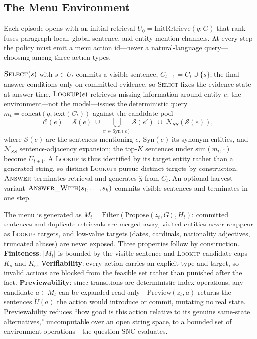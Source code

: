 \documentclass[letterpaper]{article} %
\begin{document}
\subsection{The Menu Environment}

Each episode opens with an initial retrieval $U_0=\mathrm{InitRetrieve}(q;G)$ that rank-fuses paragraph-local, global-sentence, and entity-mention channels. At every step the policy must emit a menu action id---never a natural-language query---choosing among three action types.

$\textsc{Select}(s)$ with $s\in U_t$ commits a visible sentence, $C_{t+1}=C_t\cup\{s\}$; the final answer conditions only on committed evidence, so \textsc{Select} fixes the evidence state at answer time. $\textsc{Lookup}(e)$ retrieves missing information around entity $e$: the environment---not the model---issues the deterministic query $m_t=\mathrm{concat}(q,\mathrm{text}(C_t))$ against the candidate pool
\begin{equation}
\mathcal{C}(e)=\mathcal{S}(e)\;\cup \bigcup_{e'\in \mathrm{Syn}(e)}\mathcal{S}(e')\;\cup\;\mathcal{N}_{SS}(\mathcal{S}(e)),
\end{equation}
where $\mathcal{S}(e)$ are the sentences mentioning $e$, $\mathrm{Syn}(e)$ its synonym entities, and $\mathcal{N}_{SS}$ sentence-adjacency expansion; the top-$K$ sentences under $\mathrm{sim}(m_t,\cdot)$ become $U_{t+1}$. A \textsc{Lookup} is thus identified by its target entity rather than a generated string, so distinct \textsc{Lookup}s pursue distinct targets by construction. $\textsc{Answer}$ terminates retrieval and generates $\hat y$ from $C_t$. An optional harvest variant $\textsc{Answer\_With}(s_1,\ldots,s_k)$ commits visible sentences and terminates in one step.

The menu is generated as $M_t=\mathrm{Filter}(\mathrm{Propose}(z_t,G),H_t)$: committed sentences and duplicate retrievals are merged away, visited entities never reappear as \textsc{Lookup} targets, and low-value targets (dates, cardinals, nationality adjectives, truncated aliases) are never exposed. Three properties follow by construction. \textbf{Finiteness}: $|M_t|$ is bounded by the visible-sentence and \textsc{Lookup}-candidate caps $K_s$ and $K_e$. \textbf{Verifiability}: every action carries an explicit type and target, so invalid actions are blocked from the feasible set rather than punished after the fact. \textbf{Previewability}: since transitions are deterministic index operations, any candidate $a\in M_t$ can be expanded read-only---$\mathrm{Preview}(z_t,a)$ returns the sentences $\widetilde{U}(a)$ the action would introduce or commit, mutating no real state. Previewability reduces ``how good is this action relative to its genuine same-state alternatives,'' uncomputable over an open string space, to a bounded set of environment operations---the question SNC evaluates.
\end{document}
